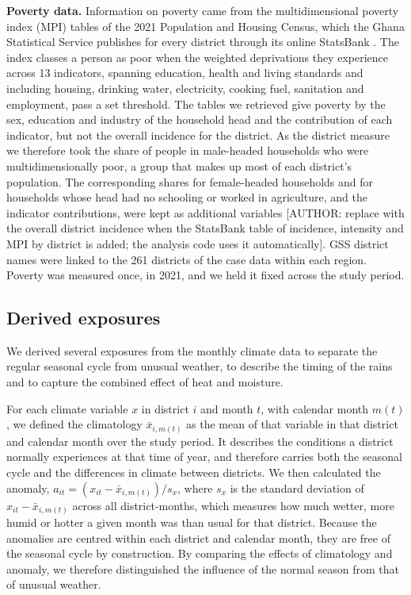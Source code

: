 \documentclass[11pt,a4paper]{article}
\begin{document}
\textbf{Poverty data.} Information on poverty came from the multidimensional poverty index (MPI) tables of the 2021 Population and Housing Census, which the Ghana Statistical Service publishes for every district through its online StatsBank \cite{ref25}. The index classes a person as poor when the weighted deprivations they experience across 13 indicators, spanning education, health and living standards and including housing, drinking water, electricity, cooking fuel, sanitation and employment, pass a set threshold. The tables we retrieved give poverty by the sex, education and industry of the household head and the contribution of each indicator, but not the overall incidence for the district. As the district measure we therefore took the share of people in male-headed households who were multidimensionally poor, a group that makes up most of each district's population. The corresponding shares for female-headed households and for households whose head had no schooling or worked in agriculture, and the indicator contributions, were kept as additional variables {[}AUTHOR: replace with the overall district incidence when the StatsBank table of incidence, intensity and MPI by district is added; the analysis code uses it automatically{]}. GSS district names were linked to the 261 districts of the case data within each region. Poverty was measured once, in 2021, and we held it fixed across the study period.

\subsection{Derived exposures}

We derived several exposures from the monthly climate data to separate the regular seasonal cycle from unusual weather, to describe the timing of the rains and to capture the combined effect of heat and moisture.

For each climate variable \(x\) in district \(i\) and month \(t\), with calendar month \(m(t)\), we defined the climatology \(\bar{x}_{i,m(t)}\) as the mean of that variable in that district and calendar month over the study period. It describes the conditions a district normally experiences at that time of year, and therefore carries both the seasonal cycle and the differences in climate between districts. We then calculated the anomaly, \(a_{it} = (x_{it} - \bar{x}_{i,m(t)})/s_x\), where \(s_x\) is the standard deviation of \(x_{it} - \bar{x}_{i,m(t)}\) across all district-months, which measures how much wetter, more humid or hotter a given month was than usual for that district. Because the anomalies are centred within each district and calendar month, they are free of the seasonal cycle by construction. By comparing the effects of climatology and anomaly, we therefore distinguished the influence of the normal season from that of unusual weather.
\end{document}
